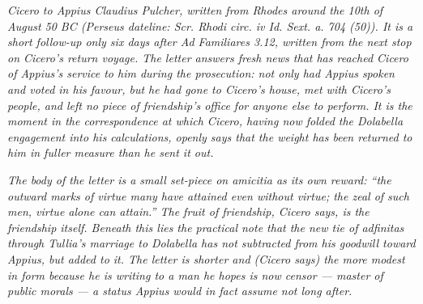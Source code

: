 
\textit{Cicero to Appius Claudius Pulcher, written from
Rhodes around the 10th of August 50 BC (Perseus
dateline: \textit{Scr. Rhodi circ. iv Id. Sext. a. 704
(50)}). It is a short follow-up only six days after
\textit{Ad Familiares} 3.12, written from the next
stop on Cicero's return voyage. The letter answers
fresh news that has reached Cicero of Appius's
service to him during the prosecution: not only had
Appius spoken and voted in his favour, but he had
gone to Cicero's house, met with Cicero's people, and
left no piece of friendship's office for anyone else
to perform. It is the moment in the correspondence at
which Cicero, having now folded the Dolabella
engagement into his calculations, openly says that the
weight has been returned to him in fuller measure than
he sent it out.}

\textit{The body of the letter is a small set-piece on
\textit{amicitia} as its own reward: ``the outward
marks of virtue many have attained even without
virtue; the zeal of such men, virtue alone can
attain.'' The fruit of friendship, Cicero says, is
the friendship itself. Beneath this lies the practical
note that the new tie of \textit{adfinitas} through
Tullia's marriage to Dolabella has not subtracted from
his goodwill toward Appius, but added to it. The
letter is shorter and (Cicero says) the more modest
in form because he is writing to a man he hopes is
now \textit{censor} --- master of public morals --- a
status Appius would in fact assume not long after.}

